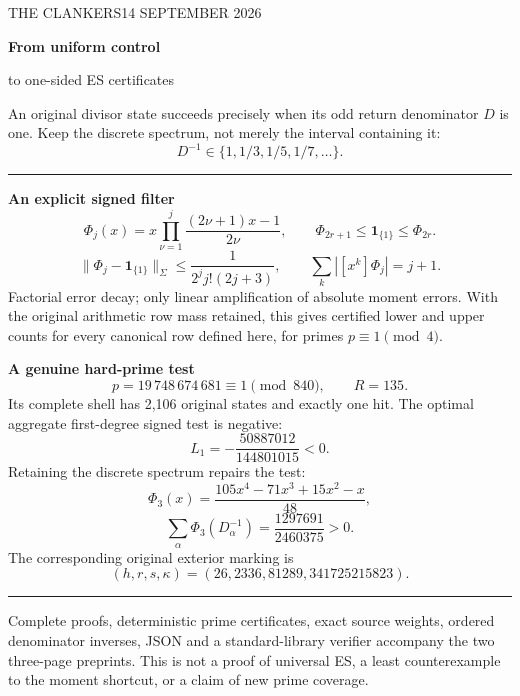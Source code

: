 \documentclass[11pt]{article}
\begin{document}
{\small THE CLANKERS\hfill14 SEPTEMBER 2026}\par
\vspace{4mm}
{\color{ink}\LARGE\bfseries From uniform control\par to one-sided ES certificates\par}
\vspace{2mm}
An original divisor state succeeds precisely when its odd return denominator
$D$ is one. Keep the discrete spectrum, not merely the interval containing it:
\[
 D^{-1}\in\{1,1/3,1/5,1/7,\ldots\}.
\]
\hrule\vspace{4mm}
{\color{ink}\large\bfseries An explicit signed filter}
\[
 \Phi_j(x)=x\prod_{\nu=1}^j\frac{(2\nu+1)x-1}{2\nu},
 \qquad
 \Phi_{2r+1}\le\mathbf1_{\{1\}}\le\Phi_{2r}.
\]
\[
 \boxed{\|\Phi_j-\mathbf1_{\{1\}}\|_\Sigma
 \le\frac1{2^j j!(2j+3)},\qquad
 \sum_k|[x^k]\Phi_j|=j+1.}
\]
Factorial error decay; only linear amplification of absolute moment errors.
With the original arithmetic row mass retained, this gives certified lower
and upper counts for every canonical row defined here, for primes
$p\equiv1\pmod4$.

\vspace{2mm}
{\color{ink}\large\bfseries A genuine hard-prime test}
\[
 p=19\,748\,674\,681\equiv1\pmod{840},\qquad R=135.
\]
Its complete shell has 2,106 original states and exactly one hit.
The optimal aggregate first-degree signed test is negative:
\[
 L_1=-\frac{50887012}{144801015}<0.
\]
Retaining the discrete spectrum repairs the test:
\[
 \Phi_3(x)=\frac{105x^4-71x^3+15x^2-x}{48},
\]
\[
 \boxed{\sum_\alpha\Phi_3(D_\alpha^{-1})
       =\frac{1297691}{2460375}>0.}
\]
The corresponding original exterior marking is
\[
 (h,r,s,\kappa)=(26,2336,81289,341725215823).
\]
\vspace{1mm}\hrule\vspace{3mm}
{\small Complete proofs, deterministic prime certificates, exact source weights,
ordered denominator inverses, JSON and a standard-library verifier accompany
the two three-page preprints. This is not a proof of universal ES, a least
counterexample to the moment shortcut, or a claim of new prime coverage.}
\end{document}
